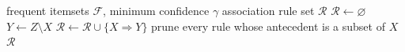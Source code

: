 \begin{algorithm}
\caption{Rule generation with confidence pruning}
\label{alg:rules}
\begin{algorithmic}[1]
\Require frequent itemsets $\mathcal{F}$, minimum confidence $\gamma$
\Ensure association rule set $\mathcal{R}$
\State $\mathcal{R} \gets \varnothing$
        \State $Y \gets Z \setminus X$
            \State $\mathcal{R} \gets \mathcal{R} \cup \{X \Rightarrow Y\}$
        \Else
            \State prune every rule whose antecedent is a subset of $X$ 
        \EndIf
    \EndFor
\EndFor
\State \Return $\mathcal{R}$
\end{algorithmic}
\end{algorithm}
